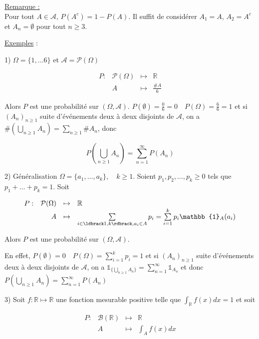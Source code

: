 \documentclass[12pt]{article}
\newcommand{\petitespace}{\vspace{0.5cm}}
\newcommand{\bb}[1]{\mathbb{#1}} %
\newcommand{\R}{\bb{R}} %
\newcommand{\union}[2]{\overset{#2}{\underset{#1}{\bigcup}}} %
\newcommand{\Rq}{\underline{Remarque :} \\}
\newcommand{\somme}[2]{\sum\limits_{#1}^{#2}}
\renewcommand{\cal}{\mathcal}
\newcommand{\1}{\bb{1}} %
\begin{document}
\Rq 

Pour tout \(A\in\mathcal A\), \(P(A^c)=1-P(A)\). Il suffit de considérer \(A_1=A\), \(A_2=A^c\) et \(A_n=\emptyset\) pour tout \(n\geq 3\).

\petitespace

\underline{Exemples} : \petitespace

1) $\Omega = \{ 1, \ldots 6 \}$ et $\cal A = \cal P(\Omega)$

$$\begin{array}{rrrl} %
  P :& \cal P(\Omega) &\mapsto&\R \\
  & A & \mapsto &  \frac{\# A }{6} \end{array}$$

Alors $P$ est une probabilité sur $(\Omega, \cal A)$. $P(\emptyset) = \frac 06 = 0 \quad P(\Omega) = \frac{6}{6} = 1$ et si $(A_n)_{n \ge 1}$ suite d'événements deux à deux disjoints de $\cal A$, on a $\# (\union{n \ge 1}{} A_n ) = \somme{n \ge 1}{} \# A_n$, donc 

$$P(\union{n \ge 1}{} A_n ) = \somme{n=1}{\infty} P(A_n) $$

\petitespace

2) Généralisation $\Omega = \{a_1, \ldots, a_k \}, \quad k \ge 1$. Soient $p_1, p_2, \ldots, p_k \ge 0$ tels que $p_1+ \ldots+p_k = 1$. Soit 

$$\begin{array}{rrrl} %
  P :& \cal P(\Omega) &\mapsto&\R \\
  & A & \mapsto & \somme{i\in \ldbrack 1,k \rdbrack,  a_i \in A}{} p_i = \somme{i=1}{k} p_i \1_{A}(a_i) \end{array}$$


Alors $P$ est une probabilité sur $(\Omega, \cal A)$.\petitespace

En effet, $P(\emptyset) = 0 \quad P(\Omega) = \somme{i=1}{k}p_i = 1$ et si $(A_n)_{n \ge 1}$ suite d'événements deux à deux disjoints de $\cal A$, on a $\1_{\big\{ \union{n \ge 1}{} A_n\big\} } = \somme{n=1}{\infty} \1_{A_n} $ et donc $P(\union{n \ge 1}{} A_n) = \somme{n=1}{\infty} P(A_n)$


\petitespace

3) Soit $f : \R \mapsto \R$ une fonction mesurable positive telle que $\int_\R f(x) dx = 1$ et soit 

$$\begin{array}{rrrl} %
  P :& \cal B(\R)  &\mapsto&\R \\
  & A & \mapsto &  \int_A f(x)dx \end{array}$$
\end{document}
